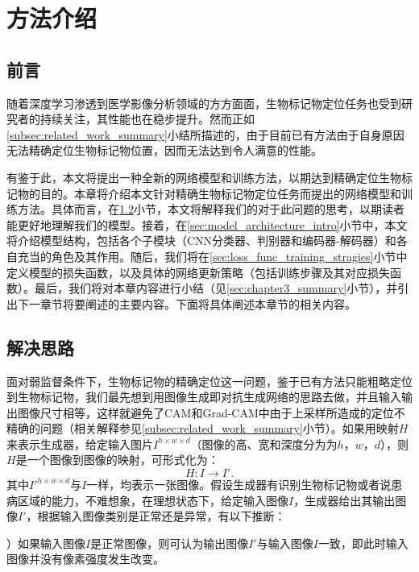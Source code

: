 \chapter{方法介绍}\label{sec:method}
\section{前言}
随着深度学习渗透到医学影像分析领域的方方面面，生物标记物定位任务也受到研究者的持续关注，其性能也在稳步提升。然而正如\ref{subsec:related_work_summary}小结所描述的，由于目前已有方法由于自身原因无法精确定位生物标记物位置，因而无法达到令人满意的性能。

有鉴于此，本文将提出一种全新的网络模型和训练方法，以期达到精确定位生物标记物的目的。本章将介绍本文针对精确生物标记物定位任务而提出的网络模型和训练方法。具体而言，在\ref{sec:idea_thinking}小节，本文将解释我们的对于此问题的思考，以期读者能更好地理解我们的模型。接着，在\ref{sec:model_architecture_intro}小节中，本文将介绍模型结构，包括各个子模块（CNN分类器、判别器和编码器-解码器）和各自充当的角色及其作用。随后，我们将在\ref{sec:loss_func_training_stragies}小节中定义模型的损失函数，以及具体的网络更新策略（包括训练步骤及其对应损失函数）。最后，我们将对本章内容进行小结（见\ref{sec:chapter3_summary}小节），并引出下一章节将要阐述的主要内容。下面将具体阐述本章节的相关内容。
\section{解决思路}\label{sec:idea_thinking}
面对弱监督条件下，生物标记物的精确定位这一问题，鉴于已有方法只能粗略定位到生物标记物，我们最先想到用图像生成即对抗生成网络的思路去做，并且输入输出图像尺寸相等，这样就避免了CAM和Grad-CAM中由于上采样所造成的定位不精确的问题（相关解释参见\ref{subsec:related_work_summary}小节）。如果用映射$H$来表示生成器，给定输入图片$I^{h\times w\times d}$（图像的高、宽和深度分为为$h$，$w$，$d$），则$H$是一个图像到图像的映射，可形式化为：
\begin{equation*}
H: I \to I'.
\end{equation*}
其中$I'^{h\times w\times d}$与$I$一样，均表示一张图像。假设生成器有识别生物标记物或者说患病区域的能力，不难想象，在理想状态下，给定输入图像$I$，生成器给出其输出图像$I'$，根据输入图像类别是正常还是异常，有以下推断：

）如果输入图像$I$是正常图像，则可认为输出图像$I'$与输入图像$I$一致，即此时输入图像并没有像素强度发生改变。

